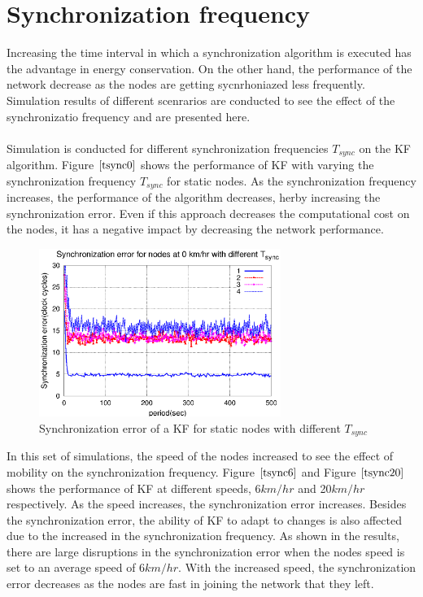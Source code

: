 \documentclass[a4paper,10pt]{report}
\begin{document}
\section{\textbf{Synchronization frequency}}
Increasing the time interval in which a synchronization algorithm is
executed has the advantage in energy conservation. On the other
hand, the performance of the network decrease as the nodes are
getting sycnrhoniazed less frequently. Simulation results of
different scenrarios are conducted
 to see the effect of the synchronizatio frequency and are presented here.
\paragraph*{}
Simulation is conducted for different synchronization frequencies $T_{sync}$ on the KF algorithm. Figure $\ref{tsync0}$ shows the performance of KF with varying the synchronization frequency $T_{sync}$ for static nodes. As the synchronization frequency increases, the performance of the algorithm decreases, herby increasing the synchronization error. Even if this approach decreases the computational cost on the nodes, it has a negative impact by decreasing the network performance.
\begin{figure}[!h]
\centering
\includegraphics[width= 0.7\textwidth]{tsync0}
\caption{Synchronization error of a KF for static nodes with different $T_{sync}$} \label{tsync0}
\end{figure}
In this set of simulations, the speed of the nodes increased to see the effect of mobility on the
 synchronization frequency. Figure $\ref{tsync6}$ and Figure $\ref{tsync20}$ shows the performance of KF at different speeds, 6$km/hr$ and 20$km/hr$ respectively.
As the speed increases, the synchronization error increases. Besides the synchronization error,
 the ability of KF to adapt to changes is also affected due to the increased in the synchronization frequency. As shown in the results, there are large disruptions in the synchronization error when the nodes speed is set to an average speed of $6km/hr$. With the increased speed, the synchronization error decreases as the nodes are fast in joining the network that they left.
\end{document}
